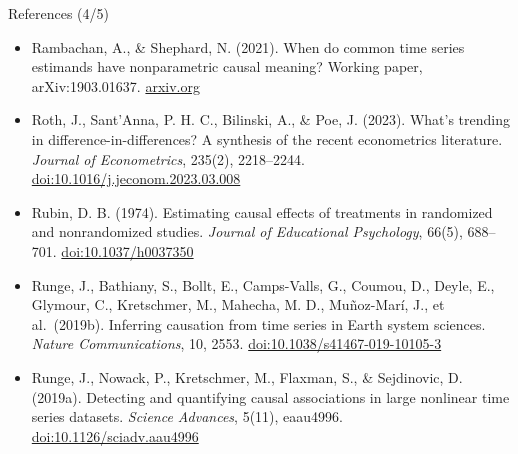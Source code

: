 \begin{frame}{References (4/5)}
\begin{itemize}
    \item Rambachan, A., \& Shephard, N. (2021). When do common time series estimands have nonparametric causal meaning? Working paper, arXiv:1903.01637. \href{https://arxiv.org/abs/1903.01637}{arxiv.org}
    \item Roth, J., Sant’Anna, P. H. C., Bilinski, A., \& Poe, J. (2023). What’s trending in difference-in-differences? A synthesis of the recent econometrics literature. \textit{Journal of Econometrics}, 235(2), 2218--2244. \href{https://doi.org/10.1016/j.jeconom.2023.03.008}{doi:10.1016/j.jeconom.2023.03.008}
    \item Rubin, D. B. (1974). Estimating causal effects of treatments in randomized and nonrandomized studies. \textit{Journal of Educational Psychology}, 66(5), 688--701. \href{https://doi.org/10.1037/h0037350}{doi:10.1037/h0037350}
    \item Runge, J., Bathiany, S., Bollt, E., Camps-Valls, G., Coumou, D., Deyle, E., Glymour, C., Kretschmer, M., Mahecha, M. D., Muñoz-Marí, J., et al.\ (2019b). Inferring causation from time series in Earth system sciences. \textit{Nature Communications}, 10, 2553. \href{https://doi.org/10.1038/s41467-019-10105-3}{doi:10.1038/s41467-019-10105-3}
    \item Runge, J., Nowack, P., Kretschmer, M., Flaxman, S., \& Sejdinovic, D. (2019a). Detecting and quantifying causal associations in large nonlinear time series datasets. \textit{Science Advances}, 5(11), eaau4996. \href{https://doi.org/10.1126/sciadv.aau4996}{doi:10.1126/sciadv.aau4996}
\end{itemize}
\end{frame}

